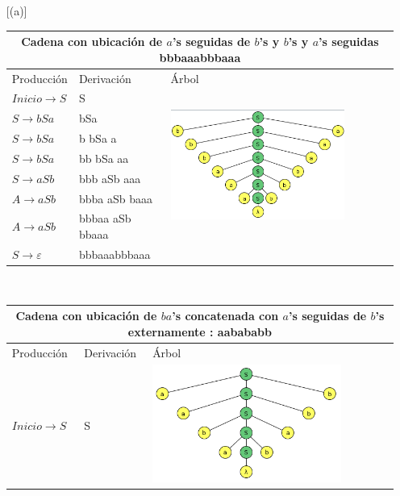 \documentclass{article}
\begin{document}
\begin{enumerate} [(a)]
        \begin{tabular}{|p{5cm}|p{5cm}|p{5cm}|  }
        \hline
        \multicolumn{3}{|c|}{Cadena con ubicación de $a$'s seguidas de $b$'s  y $b$'s y $a$'s seguidas bbbaaabbbaaa} \\
        \hline
        Producción & Derivación & Árbol\\
        \hline
        $ Inicio \to S$ & S & \multirow{7}{*}{
        \centering
        \begin{minipage}{.3\textwidth}
        \includegraphics[width=0.8\textwidth]{img/eje_a_caso1.png}
        \end{minipage}
        } \\
         $ S \to bSa$ & bSa & \\
         $ S \to bSa$ & b bSa a & \\
         $ S \to bSa$ & bb bSa aa &\\
         $ S \to aSb$ & bbb aSb aaa &\\
         $ A \to aSb$ & bbba aSb baaa &\\
         $ A \to aSb$ & bbbaa aSb bbaaa &\\
         $ S \to \varepsilon$ & bbbaaabbbaaa &\\
         \hline
        \end{tabular}
        \\
        \begin{tabular}{|p{5cm}|p{5cm}|p{5cm}|  }
        \hline
        \multicolumn{3}{|c|}{Cadena con ubicación de $ba$'s  concatenada con $a$'s seguidas de $b$'s externamente : aabababb} \\
        \hline
        Producción & Derivación & Árbol\\
        \hline
        $ Inicio \to S$ & S & \multirow{7}{*}{
        \begin{minipage}{.3\textwidth}
        \includegraphics[width=0.8\textwidth]{img/eje_a_caso2.png}

\end{minipage}}
\end{tabular}
\end{enumerate}
\end{document}
